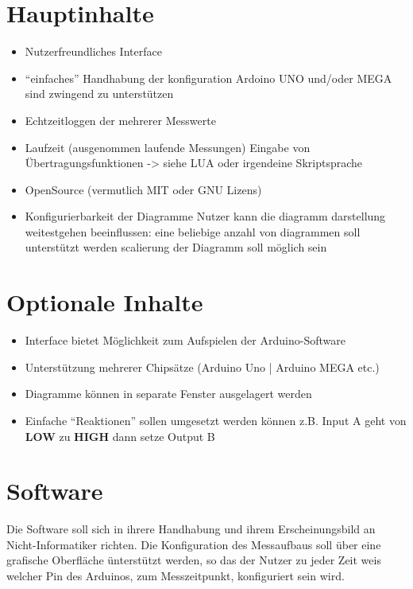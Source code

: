 \section{Hauptinhalte}
\begin{itemize}
 \item Nutzerfreundliches Interface
 \item ``einfaches'' Handhabung der konfiguration
  \subitem Ardoino UNO und/oder MEGA sind zwingend zu unterstützen
 \item Echtzeitloggen der mehrerer Messwerte
 \item Laufzeit (ausgenommen laufende Messungen) Eingabe von 
Übertragungsfunktionen -> siehe LUA oder irgendeine 
Skriptsprache
 \item OpenSource (vermutlich MIT oder GNU Lizens)
 \item Konfigurierbarkeit der Diagramme
  \subitem Nutzer kann die diagramm darstellung weitestgehen beeinflussen:
    \subsubitem eine beliebige anzahl von diagrammen soll unterstützt werden
    \subsubitem scalierung der Diagramm soll möglich sein
\end{itemize}

\section{Optionale Inhalte}
\begin{itemize}
 \item Interface bietet Möglichkeit zum Aufspielen der Arduino-Software
 \item Unterstützung mehrerer Chipsätze (Arduino Uno | Arduino MEGA etc.)
 \item Diagramme können in separate Fenster ausgelagert werden
 \item Einfache ``Reaktionen'' sollen umgesetzt werden können
  \subitem z.B. Input A geht von \textbf{LOW} zu \textbf{HIGH} dann setze Output 
B
\end{itemize}


\section {Software}
Die Software soll sich in ihrere Handhabung und ihrem Erscheinungsbild an
Nicht-Informatiker richten. Die Konfiguration des Messaufbaus soll über eine
grafische Oberfläche ünterstützt werden, so das der Nutzer zu jeder Zeit weis 
welcher Pin des Arduinos, zum Messzeitpunkt, konfiguriert sein wird.

